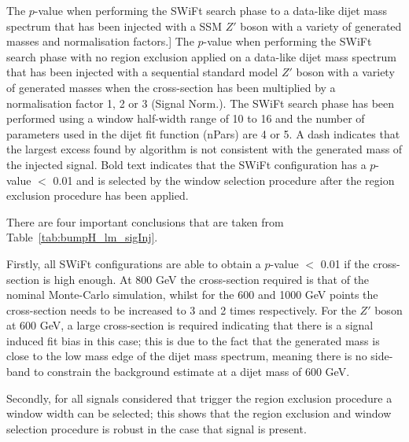\begin{table}[!ht]
\caption
    [The  \bh{} \mbox{$p$-value} when performing the SWiFt search phase to
      a data-like dijet mass spectrum that has been injected with a SSM $Z'$ boson with
      a variety of generated masses and normalisation factors.]
    {\label{tab:bumpH_lm_sigInj}
      The  \bh{} \mbox{$p$-value} when performing the SWiFt search phase with no region exclusion applied
      on a data-like dijet mass spectrum that has been injected with a sequential standard model $Z'$ boson with
      a variety of generated masses when the cross-section has been multiplied by a normalisation factor 1, 2 or 3 (Signal Norm.).
      The SWiFt search phase has been performed using a window half-width range of 10 to 16
      and the number of parameters used in the dijet fit function (nPars) are 4 or 5.
      A dash indicates that the largest excess found by \bh{} algorithm is not consistent with the generated mass of the injected signal.
      Bold text indicates that the SWiFt configuration has a \bh{} $p$-value $<$ 0.01
      and is selected by the window selection procedure after the region exclusion procedure has been applied. }
\end{table}


There are four important conclusions that are taken from Table~\ref{tab:bumpH_lm_sigInj}.

Firstly, all SWiFt configurations are able to obtain a \bh{} $p$-value $<$ 0.01 if the cross-section is high enough.
At 800 GeV the cross-section required is that of the nominal Monte-Carlo simulation, whilst for the 600 and 1000 GeV points
the cross-section needs to be increased to 3 and 2 times respectively.
For the $Z'$ boson at 600 GeV, a large cross-section is required indicating that
there is a signal induced fit bias in this case;
this is due to the fact that the generated mass is close to the low mass edge of the 
dijet mass spectrum, meaning there is no side-band to constrain the background estimate at a dijet mass of 600 GeV.

Secondly, for all signals considered that trigger the region exclusion procedure a window width can be selected;
this shows that the region exclusion and window selection procedure is robust in the case that signal is present.

